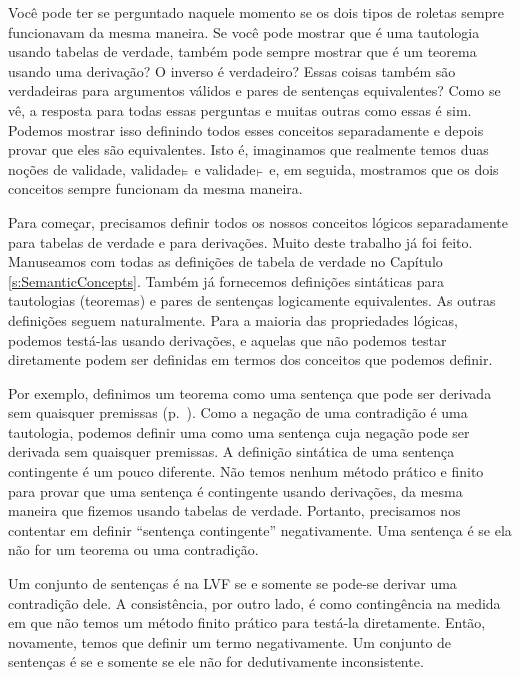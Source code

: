 Voc\^e pode ter se perguntado naquele momento se os dois tipos de roletas sempre funcionavam da mesma maneira. Se voc\^e pode mostrar que  \'e uma tautologia usando tabelas de verdade, tamb\'em pode sempre mostrar que \'e um teorema usando uma deriva\c c\~ao? O inverso \'e verdadeiro? Essas coisas tamb\'em s\~ao verdadeiras para argumentos v\'alidos e pares de senten\c cas equivalentes? Como se v\^e, a resposta para todas essas perguntas e muitas outras como essas \'e sim. Podemos mostrar isso definindo todos esses conceitos separadamente e depois provar que eles s\~ao equivalentes.  Isto \'e, imaginamos que realmente temos duas no\c c\~oes de validade, validade$_{\vDash}$ e validade$_{\vdash}$ e, em seguida, mostramos que os dois conceitos sempre funcionam da mesma maneira.


Para come\c car, precisamos definir todos os nossos conceitos l\'ogicos separadamente para tabelas de verdade e  para deriva\c c\~oes. Muito deste trabalho j\'a foi feito.  Manuseamos com todas as defini\c c\~oes de tabela de verdade no Capítulo \ref{s:SemanticConcepts}. Tamb\'em j\'a fornecemos defini\c c\~oes sint\'aticas para tautologias (teoremas) e pares de senten\c cas logicamente equivalentes. As outras defini\c c\~oes seguem naturalmente. Para a maioria das propriedades l\'ogicas, podemos test\'a-las usando deriva\c c\~oes, e aquelas que n\~ao podemos testar diretamente podem ser definidas em termos dos conceitos que podemos definir.

Por exemplo, definimos um teorema como uma senten\c ca que pode ser derivada sem quaisquer premissas (p.~\pageref{def:syntactic_tautology_in_sl}). Como a nega\c c\~ao de uma contradi\c c\~ao \'e uma tautologia, podemos definir uma  \label{def:syntactic_contradiction_in_sl} como uma senten\c ca cuja nega\c c\~ao pode ser derivada sem quaisquer premissas. A defini\c c\~ao sint\'atica de uma senten\c ca contingente \'e um pouco diferente. N\~ao temos nenhum m\'etodo pr\'atico e finito para provar que uma senten\c ca \'e contingente usando deriva\c c\~oes, da mesma maneira que fizemos usando tabelas de verdade. Portanto, precisamos nos contentar em definir ``senten\c ca contingente'' negativamente. Uma senten\c ca \'e  \label{def:syntactically_contingent_in_sl} se ela  n\~ao for um teorema ou uma contradi\c c\~ao. 
 

Um  conjunto de senten\c cas \'e  na LVF \label{def:syntactically_inconsistent_ in_sl}  se e somente se pode-se derivar uma contradi\c c\~ao dele. A consist\^encia, por outro lado, \'e como conting\^encia na medida em que n\~ao temos um m\'etodo finito pr\'atico para test\'a-la diretamente. Ent\~ao, novamente, temos que definir um termo negativamente. Um  conjunto de senten\c cas \'e  \label{def:syntactically consistent in SL} se e somente se ele n\~ao for dedutivamente inconsistente.
    
